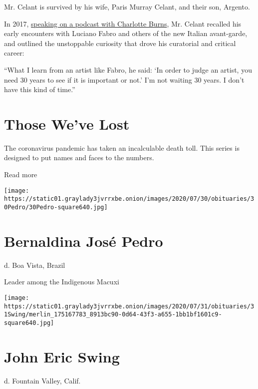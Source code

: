 Mr. Celant is survived by his wife, Paris Murray Celant, and their son,
Argento.

In 2017,
\href{https://www.artagencypartners.com/episode-19-transcript-germano-celant-and-allan-schwartzman/}{speaking
on a podcast with Charlotte Burns}, Mr. Celant recalled his early
encounters with Luciano Fabro and others of the new Italian avant-garde,
and outlined the unstoppable curiosity that drove his curatorial and
critical career:

``What I learn from an artist like Fabro, he said: `In order to judge an
artist, you need 30 years to see if it is important or not.' I'm not
waiting 30 years. I don't have this kind of time.''

\href{https://www.nytimes3xbfgragh.onion/interactive/2020/obituaries/people-died-coronavirus-obituaries.html?action=click\&pgtype=Article\&state=default\&region=BELOW_MAIN_CONTENT\&context=covid_obits_promo}{}

\hypertarget{those-weve-lost}{%
\section{Those We've Lost}\label{those-weve-lost}}

The coronavirus pandemic has taken an incalculable death toll. This
series is designed to put names and faces to the numbers.

Read more

\texttt{[image: https://static01.graylady3jvrrxbe.onion/images/2020/07/30/obituaries/30Pedro/30Pedro-square640.jpg]}

\hypertarget{bernaldina-josuxe9-pedro}{%
\section{Bernaldina José Pedro}\label{bernaldina-josuxe9-pedro}}

d. Boa Vista, Brazil

Leader among the Indigenous Macuxi

\texttt{[image: https://static01.graylady3jvrrxbe.onion/images/2020/07/31/obituaries/31Swing/merlin\_175167783\_8913bc90-0d64-43f3-a655-1bb1bf1601c9-square640.jpg]}

\hypertarget{john-eric-swing}{%
\section{John Eric Swing}\label{john-eric-swing}}

d. Fountain Valley, Calif.

